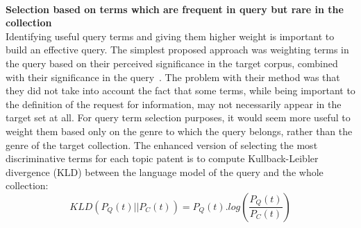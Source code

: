 \ \\
\textbf{Selection based on terms which are frequent in query but rare in the collection}
\ \\
Identifying useful query terms and giving them higher weight is important to build an effective query. The simplest proposed approach was weighting terms in the query based on their perceived significance in the target corpus, combined with their significance in the query~\citep{itoh2003term}. The problem with their method was that they did not take into account the fact that some terms, while being important to the definition of the request for information, may not necessarily appear in the target set at all. For query term selection purposes, it would seem more useful to weight them based only on the genre to which the query belongs, rather than the genre of the target collection. The enhanced version of selecting the most discriminative terms for each topic patent is to compute Kullback-Leibler divergence (KLD) between the language model of the query and the whole collection:
\begin{equation}
\label{eq:kld}
 KLD(P_{Q}(t)||P_{C}(t)) = P_{Q}(t).log(\frac{P_{Q}(t)}{P_{C}(t)})  
\end{equation}


